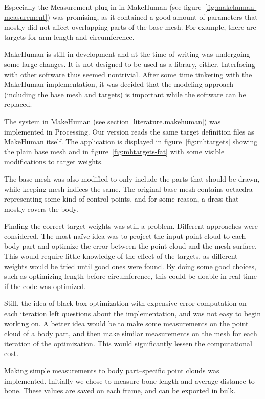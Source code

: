 Especially the Measurement plug-in in MakeHuman (see figure~\ref{fig:makehuman-measurement}) was promising, as it contained a good amount of parameters that mostly did not affect overlapping parts of the base mesh. For example, there are targets for arm length and circumference.

MakeHuman is still in development and at the time of writing was undergoing some large changes. It is not designed to be used as a library, either. Interfacing with other software thus seemed nontrivial. After some time tinkering with the MakeHuman implementation, it was decided that the modeling approach (including the base mesh and targets) is important while the software can be replaced.

The  system in MakeHuman (see section \ref{literature.makehuman}) was implemented in Processing. Our version reads the same target definition files as MakeHuman itself. The application is displayed in figure~\ref{fig:mhtargets} showing the plain base mesh and in figure~\ref{fig:mhtargets-fat} with some visible modifications to target weights.

The base mesh was also modified to only include the parts that should be drawn, while keeping mesh indices the same. The original base mesh contains octaedra representing some kind of control points, and for some reason, a dress that mostly covers the body.

\newtopic

Finding the correct target weights was still a problem. Different approaches were considered. The most naïve idea was to project the input point cloud to each body part and optimize the error between the point cloud and the mesh surface. This would require little knowledge of the effect of the targets, as different weights would be tried until good ones were found. By doing some good choices, such as optimizing length before circumference, this could be doable in real-time if the code was optimized.

Still, the idea of black-box optimization with expensive error computation on each iteration left questions about the implementation, and was not easy to begin working on. A better idea would be to make some measurements on the point cloud of a body part, and then make similar measurements on the mesh for each iteration of the optimization. This would significantly lessen the computational cost.

Making simple measurements to body part--specific point clouds was implemented. Initially we chose to measure bone length and average distance to bone. These values are saved on each frame, and can be exported in bulk.

